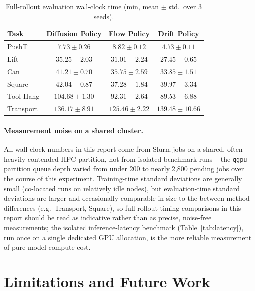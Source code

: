 \documentclass[11pt]{article}
\begin{document}
\begin{table}[H]
\centering
\caption{Full-rollout evaluation wall-clock time (min, mean $\pm$ std.\ over 3 seeds).}
\label{tab:eval}
\begin{tabular}{lccc}
\toprule
Task & Diffusion Policy & Flow Policy & Drift Policy \\
\midrule
PushT      & $7.73 \pm 0.26$   & $8.82 \pm 0.12$   & $\mathbf{4.73 \pm 0.11}$ \\
Lift       & $35.25 \pm 2.03$  & $31.01 \pm 2.24$  & $27.45 \pm 0.65$ \\
Can        & $41.21 \pm 0.70$  & $35.75 \pm 2.59$  & $33.85 \pm 1.51$ \\
Square     & $42.04 \pm 0.87$  & $37.28 \pm 1.84$  & $39.97 \pm 3.34$ \\
Tool Hang  & $104.68 \pm 1.30$ & $92.31 \pm 2.64$  & $89.53 \pm 6.88$ \\
Transport  & $136.17 \pm 8.91$ & $125.46 \pm 2.22$ & $139.48 \pm 10.66$ \\
\bottomrule
\end{tabular}
\end{table}

\paragraph{Measurement noise on a shared cluster.} All wall-clock numbers in
this report come from Slurm jobs on a shared, often heavily contended HPC
partition, not from isolated benchmark runs -- the \texttt{qgpu} partition
queue depth varied from under 200 to nearly 2,800 pending jobs over the
course of this experiment. Training-time standard deviations are generally
small (co-located runs on relatively idle nodes), but evaluation-time
standard deviations are larger and occasionally comparable in size to the
between-method differences (e.g.\ Transport, Square), so full-rollout timing
comparisons in this report should be read as indicative rather than as
precise, noise-free measurements; the isolated inference-latency benchmark
(Table~\ref{tab:latency}), run once on a single dedicated GPU allocation, is
the more reliable measurement of pure model compute cost.

\section{Limitations and Future Work}
\end{document}
